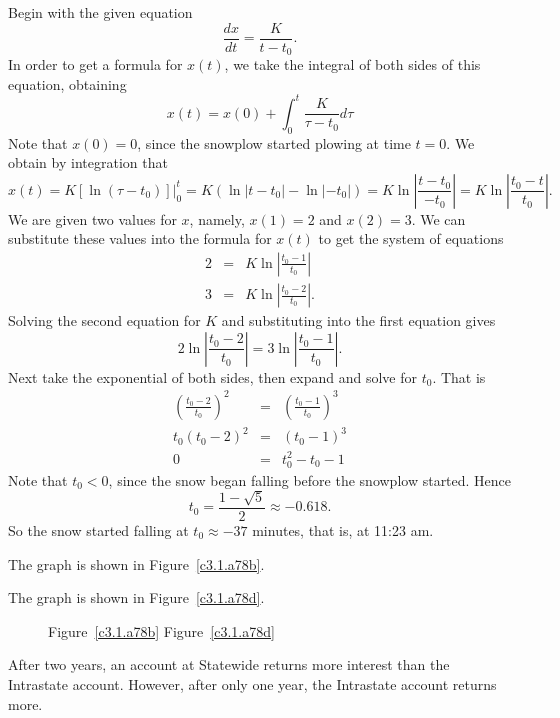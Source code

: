 \documentclass{ximera}
\begin{document}
\soln Begin with the given equation
\[
\frac{dx}{dt} = \frac{K}{t-t_0}.
\]
In order to get a formula for $x(t)$, we take the integral of both sides of
this equation, obtaining
\[
x(t) = x(0) + \int_{0}^{t} \frac{K}{\tau-t_0} d\tau
\]
Note that $x(0) = 0$, since the snowplow started plowing at time $t=0$.  We
obtain by integration that
\[
x(t) = \left.K[\ln(\tau - t_0)]\right|_{0}^{t} = K(\ln|t - t_0| - \ln|-t_0|) = 
K\ln\left|\frac{t - t_0}{-t_0}\right| = K\ln\left|\frac{t_0-t}{t_0}\right|.
\]
We are given two values for $x$, namely, $x(1) = 2$ and $x(2) = 3$.  We can
substitute these values into the formula for $x(t)$ to get the system of 
equations
\[
\begin{array}{rcl}
2 & = & K\ln\left|\frac{t_0 - 1}{t_0}\right| \\
3 & = & K\ln\left|\frac{t_0 - 2}{t_0}\right|.
\end{array}
\]
Solving the second equation for $K$ and substituting into the first equation 
gives
\[
2\ln\left|\frac{t_0 - 2}{t_0}\right| = 3\ln\left|\frac{t_0 - 1}{t_0}\right|.
\]
Next take the exponential of both sides, then expand and solve for $t_0$. 
That is
\[
\begin{array}{rcl}
\left(\frac{t_0 - 2}{t_0}\right)^2 & = & \left(\frac{t_0 - 1}{t_0}\right)^3 \\
t_0\left(t_0 - 2\right)^2 & = & \left(t_0 - 1\right)^3 \\
0 & = & t_0^2 - t_0 - 1 \end{array}
\]
Note that $t_0 < 0$, since the snow began falling before the snowplow
started.  Hence
\[
t_0 = \frac{1 - \sqrt{5}}{2} \approx -0.618.
\]
So the snow started falling at $t_0 \approx -37$ minutes, that is, at
11:23 am.

  The graph is shown in Figure~\ref{c3.1.a78b}.

  The graph is shown in Figure~\ref{c3.1.a78d}.

\begin{figure}[htb]
                       \centerline{%
                       }
	\centerline{Figure~\ref{c3.1.a78b}\hspace{2.1in} Figure~\ref{c3.1.a78d}}
\end{figure}

\ans After two years, an account at Statewide returns more interest than
the Intrastate account.  However, after only one year, the Intrastate
account returns more.
\end{document}

